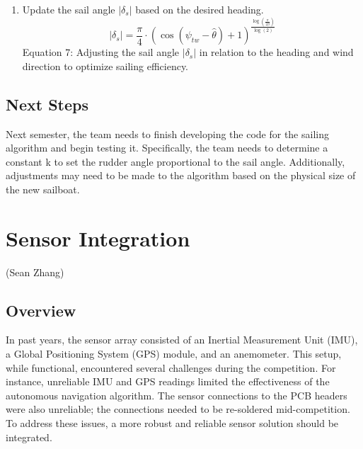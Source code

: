 \documentclass{article}
\begin{document}
\begin{enumerate}
    \item Update the sail angle \( |\delta_s| \) based on the desired heading.
    \[|\delta_s| = \frac{\pi}{4} \cdot \left(\cos(\psi_{tw} - \hat{\theta}) + 1\right)^{\frac{\log\left(\frac{\pi}{2\beta}\right)}{\log(2)}}\]
    {\tiny Equation 7: Adjusting the sail angle \( |\delta_s| \) in relation to the heading and wind direction to optimize sailing efficiency.}
\end{enumerate}
\subsection{Next Steps}
Next semester, the team needs to finish developing the code for the sailing algorithm and begin testing it. Specifically, the team needs to determine a constant k to set the rudder angle proportional to the sail angle. Additionally, adjustments may need to be made to the algorithm based on the physical size of the new sailboat.   

\section{Sensor Integration}
(Sean Zhang)
\subsection{Overview}
In past years, the sensor array consisted of an Inertial Measurement Unit (IMU), a Global Positioning System (GPS) module, and an anemometer. This setup, while functional, encountered several challenges during the competition. For instance, unreliable IMU and GPS readings limited the effectiveness of the autonomous navigation algorithm. The sensor connections to the PCB headers were also unreliable; the connections needed to be re-soldered mid-competition. To address these issues, a more robust and reliable sensor solution should be integrated.
\end{document}
